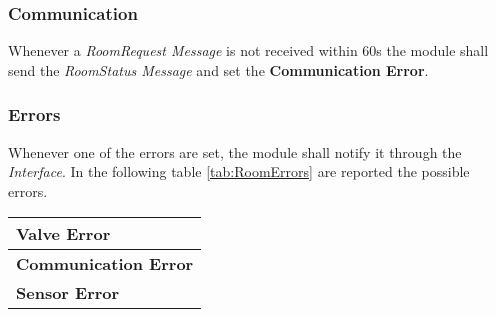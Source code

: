 \subsubsection{Communication}
Whenever a \textit{RoomRequest Message} is not received within 60s the module shall send the \textit{RoomStatus Message} and set the \textbf{Communication Error}.

\subsubsection{Errors}
Whenever one of the errors are set, the module shall notify it through the \textit{Interface}.
In the following table \ref{tab:RoomErrors} are reported the possible errors.
\begin{center}
	\begin{tabular}{|| l ||} 
		\hline
		\textbf{Valve Error} \\ 
		\hline
		\textbf{Communication Error} \\ 
		\hline
		\textbf{Sensor Error} \\ 
		\hline
	\end{tabular}
\end{center}
